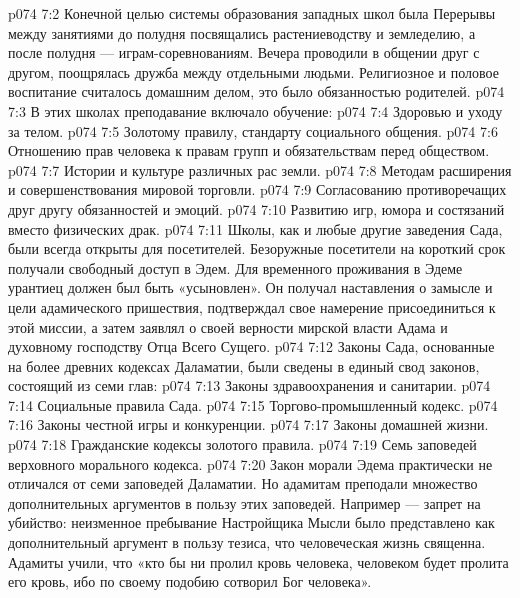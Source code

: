 \vs p074 7:2 Конечной целью системы образования западных школ была  Перерывы между занятиями до полудня посвящались растениеводству и земледелию, а после полудня --- играм\hyp{}соревнованиям. Вечера проводили в общении друг с другом, поощрялась дружба между отдельными людьми. Религиозное и половое воспитание считалось домашним делом, это было обязанностью родителей.
\vs p074 7:3 В этих школах преподавание включало обучение:
\vs p074 7:4 \bibnobreakspace Здоровью и уходу за телом.
\vs p074 7:5 \bibnobreakspace Золотому правилу, стандарту социального общения.
\vs p074 7:6 \bibnobreakspace Отношению прав человека к правам групп и обязательствам перед обществом.
\vs p074 7:7 \bibnobreakspace Истории и культуре различных рас земли.
\vs p074 7:8 \bibnobreakspace Методам расширения и совершенствования мировой торговли.
\vs p074 7:9 \bibnobreakspace Согласованию противоречащих друг другу обязанностей и эмоций.
\vs p074 7:10 \bibnobreakspace Развитию игр, юмора и состязаний вместо физических драк.
\vs p074 7:11 \pc Школы, как и любые другие заведения Сада, были всегда открыты для посетителей. Безоружные посетители на короткий срок получали свободный доступ в Эдем. Для временного проживания в Эдеме урантиец должен был быть «усыновлен». Он получал наставления о замысле и цели адамического пришествия, подтверждал свое намерение присоединиться к этой миссии, а затем заявлял о своей верности мирской власти Адама и духовному господству Отца Всего Сущего.
\vs p074 7:12 \pc Законы Сада, основанные на более древних кодексах Даламатии, были сведены в единый свод законов, состоящий из семи глав:
\vs p074 7:13 \bibnobreakspace Законы здравоохранения и санитарии.
\vs p074 7:14 \bibnobreakspace Социальные правила Сада.
\vs p074 7:15 \bibnobreakspace Торгово\hyp{}промышленный кодекс.
\vs p074 7:16 \bibnobreakspace Законы честной игры и конкуренции.
\vs p074 7:17 \bibnobreakspace Законы домашней жизни.
\vs p074 7:18 \bibnobreakspace Гражданские кодексы золотого правила.
\vs p074 7:19 \bibnobreakspace Семь заповедей верховного морального кодекса.
\vs p074 7:20 \pc Закон морали Эдема практически не отличался от семи заповедей Даламатии. Но адамитам преподали множество дополнительных аргументов в пользу этих заповедей. Например --- запрет на убийство: неизменное пребывание Настройщика Мысли было представлено как дополнительный аргумент в пользу тезиса, что человеческая жизнь священна. Адамиты учили, что «кто бы ни пролил кровь человека, человеком будет пролита его кровь, ибо по своему подобию сотворил Бог человека».
